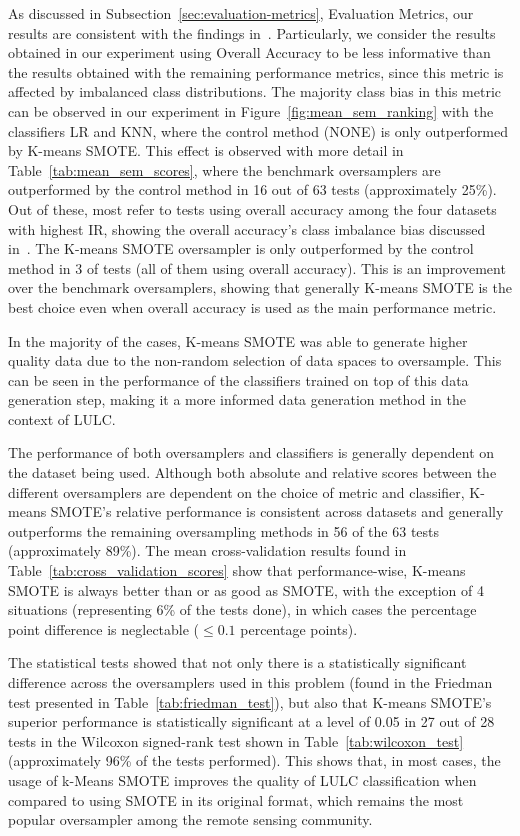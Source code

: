 \documentclass[information,article,submit,moreauthors,pdftex]{Definitions/mdpi}
\begin{document}
\begin{paracol}{2}
As discussed in Subsection~\ref{sec:evaluation-metrics}, Evaluation Metrics,
our results are consistent with the findings in~\citep{Olofsson2013,
Pontius2011}. Particularly, we consider the results obtained in our experiment
using Overall Accuracy to be less informative than the results obtained with
the remaining performance metrics, since this metric is affected by imbalanced
class distributions. The majority class bias in this metric can be observed in
our experiment in Figure~\ref{fig:mean_sem_ranking} with the
classifiers LR and KNN, where the control method (NONE) is only outperformed
by K-means SMOTE. This effect is observed with more detail in
Table~\ref{tab:mean_sem_scores}, where the benchmark oversamplers are
outperformed by the control method in 16 out of 63 tests (approximately 25\%).
Out of these, most refer to tests using overall accuracy among the four
datasets with highest IR, showing the overall accuracy's class imbalance bias
discussed in~\citep{Olofsson2013, Pontius2011}. The K-means SMOTE oversampler
is only outperformed by the control method in 3 of tests (all of them using
overall accuracy). This is an improvement over the benchmark oversamplers,
showing that generally K-means SMOTE is the best choice even when overall
accuracy is used as the main performance metric.

In the majority of the cases, K-means SMOTE was able to generate higher
quality data due to the non-random selection of data spaces to oversample.
This can be seen in the performance of the classifiers trained on top of this
data generation step, making it a more informed data generation method in the
context of LULC\@.

The performance of both oversamplers and classifiers is generally dependent on
the dataset being used. Although both absolute and relative scores between the
different oversamplers are dependent on the choice of metric and classifier,
K-means SMOTE's relative performance is consistent across datasets and
generally outperforms the remaining oversampling methods in 56 of the 63 tests
(approximately 89\%). The mean cross-validation results found in
Table~\ref{tab:cross_validation_scores} show that performance-wise, K-means
SMOTE is always better than or as good as SMOTE, with the exception of 4
situations (representing 6\% of the tests done), in which cases the percentage
point difference is neglectable ($\leq 0.1$ percentage points). 

The statistical tests showed that not only there is a statistically
significant difference across the oversamplers used in this problem (found in
the Friedman test presented in Table~\ref{tab:friedman_test}), but also that
K-means SMOTE's superior performance is statistically significant at a level
of 0.05 in 27 out of 28 tests in the Wilcoxon signed-rank test shown in
Table~\ref{tab:wilcoxon_test} (approximately 96\% of the tests performed).
This shows that, in most cases, the usage of k-Means SMOTE improves the
quality of LULC classification when compared to using SMOTE in its original
format, which remains the most popular oversampler among the remote sensing
community.


\end{paracol}
\end{document}
